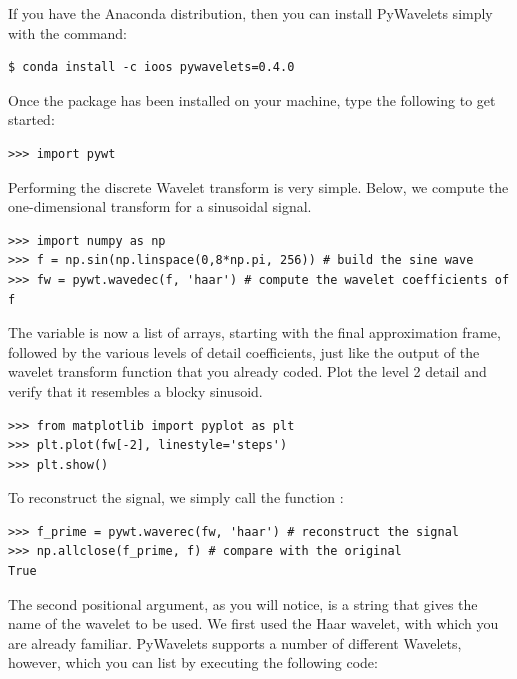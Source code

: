 If you have the Anaconda distribution, then you can install PyWavelets simply with the command:

\begin{lstlisting}
$ conda install -c ioos pywavelets=0.4.0
\end{lstlisting}

Once the package has been installed on your machine, type the following to get started:

\begin{lstlisting}
>>> import pywt
\end{lstlisting}

Performing the discrete Wavelet transform is very simple.
Below, we compute the one-dimensional transform for a sinusoidal signal.

\begin{lstlisting}
>>> import numpy as np
>>> f = np.sin(np.linspace(0,8*np.pi, 256)) # build the sine wave
>>> fw = pywt.wavedec(f, 'haar') # compute the wavelet coefficients of f
\end{lstlisting}

The variable  is now a list of arrays, starting with the final approximation
frame, followed by the various levels of detail coefficients, just like the output
of the wavelet transform function that you already coded.
Plot the level 2 detail and verify that it resembles a blocky sinusoid.

\begin{lstlisting}
>>> from matplotlib import pyplot as plt
>>> plt.plot(fw[-2], linestyle='steps')
>>> plt.show()
\end{lstlisting}

To reconstruct the signal, we simply call the function :

\begin{lstlisting}
>>> f_prime = pywt.waverec(fw, 'haar') # reconstruct the signal
>>> np.allclose(f_prime, f) # compare with the original
True
\end{lstlisting}

The second positional argument, as you will notice, is a string that gives the name of the wavelet to be used.
We first used the Haar wavelet, with which you are already familiar.
PyWavelets supports a number of different Wavelets, however, which you can list by executing the following code:

